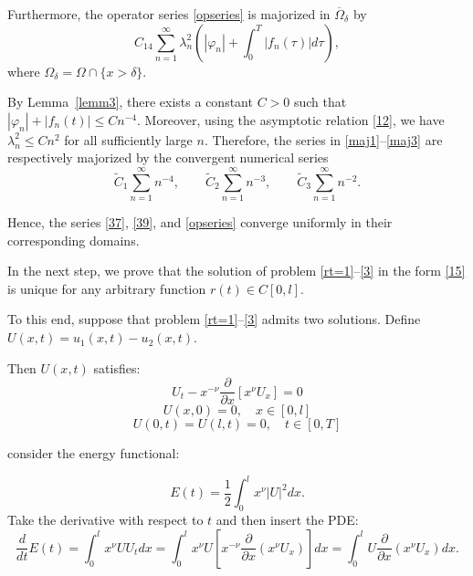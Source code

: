 \documentclass[reqno]{amsart}
\theoremstyle{definition}
\numberwithin{equation}{section}
\begin{document}
Furthermore, the operator series \eqref{opseries} is majorized in
$\overline{\Omega}_\delta$ by
\begin{equation}\label{maj3}
C_{14}\sum_{n=1}^{\infty}
\lambda_n^2\left(|\varphi_n|+\int_0^T|f_n(\tau)|
d\tau\right),
\end{equation}
where $\Omega_\delta=\Omega\cap\{x>\delta\}$.

By Lemma~\ref{lemm3}, there exists a constant $C>0$ such that
$|\varphi_n|+|f_n(t)|\le C n^{-4}$.
Moreover, using the asymptotic relation \eqref{12}, we have
$\lambda_n^2\le C n^2$ for all sufficiently large $n$.
Therefore, the series in \eqref{maj1}--\eqref{maj3} are respectively majorized by
the convergent numerical series
\begin{equation*}
    \tilde{C}_{1}\sum_{n=1}^{\infty}n^{-4},\qquad
\tilde{C}_{2}\sum_{n=1}^{\infty}n^{-3},\qquad
\tilde{C}_{3}\sum_{n=1}^{\infty}n^{-2}.
\end{equation*}


Hence, the series \eqref{37}, \eqref{39}, and \eqref{opseries} converge uniformly
in their corresponding domains.


In the next step, we prove that the solution of problem \eqref{rt=1}--\eqref{3} in the form \eqref{15} is unique for any arbitrary function $r(t)\in C[0,l]$.

To this end, suppose that problem \eqref{rt=1}--\eqref{3} admits two solutions. Define
$
U(x,t)=u_1(x,t)-u_2(x,t).
$

Then $U(x,t)$ satisfies:
\begin{equation}\label{wtenglama}
U_t-x^{-\nu}\frac{\partial}{\partial x}\left[x^{\nu}U_x\right]=0
\end{equation}
\begin{equation}\label{wbshart}
    U(x,0)=0, \quad x\in[0,l]
\end{equation}
\begin{equation}\label{wchshart}
    U(0,t)=U(l,t)=0,\quad t\in[0,T]
\end{equation}

consider the energy functional: 

\begin{equation*}
    E(t)=\frac{1}{2}\int_0^l x^{\nu} |U|^2dx.
\end{equation*}
Take the derivative with respect to $t$ and then insert the PDE:
 \begin{equation*}
     \frac{d}{dt}E(t)=\int_0^lx^{\nu}UU_tdx=\int_0^lx^{\nu}U\left[x^{-\nu}\frac{\partial}{\partial x}\left(x^{\nu}U_x\right)\right]dx=\int_0^l U\frac{\partial}{\partial x} \left(x^{\nu}U_x\right)dx.
 \end{equation*}
\end{document}
